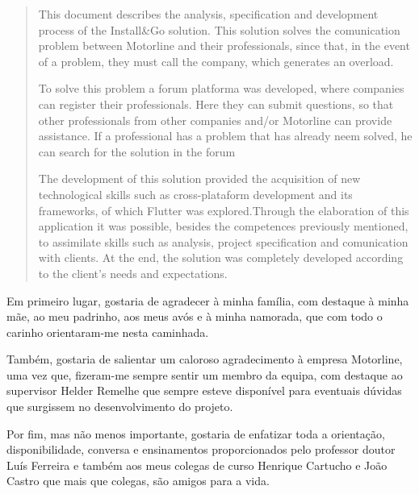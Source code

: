 \documentclass[a4paper,12pt,twoside]{book}
\begin{document}
\begin{abstract}
This document describes the analysis, specification and development process of the Install\&Go solution. This solution solves the comunication problem between Motorline and their professionals, since that, in the event of a problem, they must call the company, which generates an overload.

To solve this problem a forum platforma was developed, where companies can register their professionals. Here they can submit questions, so that other professionals from other companies and/or Motorline can provide assistance. If a professional has a problem that has already neem solved, he can search for the solution in the forum

The development of this solution provided the acquisition of new technological skills such as cross-plataform development and its frameworks, of which Flutter was explored.Through the elaboration of this application it was possible, besides the competences previously mentioned, to assimilate skills such as analysis, project specification and comunication with clients. At the end, the solution was completely developed according to the client's needs and expectations.

\end{abstract}

\begin{agradecimentos}

Em primeiro lugar, gostaria de agradecer à minha família, com destaque à minha mãe, ao meu padrinho, aos meus avós e à minha namorada, que com todo o carinho orientaram-me nesta caminhada.

Também, gostaria de salientar um caloroso agradecimento à empresa Motorline, uma vez que, fizeram-me sempre sentir um membro da equipa, com destaque ao supervisor Helder Remelhe que sempre esteve disponível para eventuais dúvidas que surgissem no desenvolvimento do projeto.

Por fim, mas não menos importante, gostaria de enfatizar toda a orientação, disponibilidade, conversa e ensinamentos proporcionados pelo professor doutor Luís Ferreira e também aos meus colegas de curso Henrique Cartucho e João Castro que mais que colegas, são amigos para a vida.
\end{agradecimentos}
\end{document}
